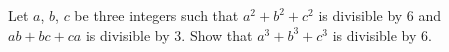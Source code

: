 Let $a$, $b$, $c$ be three integers such that $a^2 + b^2 + c^2$ is divisible by $6$ and $ab + bc + ca$ is divisible by $3$. Show that $a^3 + b^3 + c^3$ is divisible by $6$.
